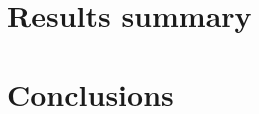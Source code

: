 \documentclass[a4paper]{article}
\begin{document}
    \section{Results summary}
    \label{sec:results}

    \section{Conclusions}
    \label{sec:conclusions}


    
    


\end{document}
